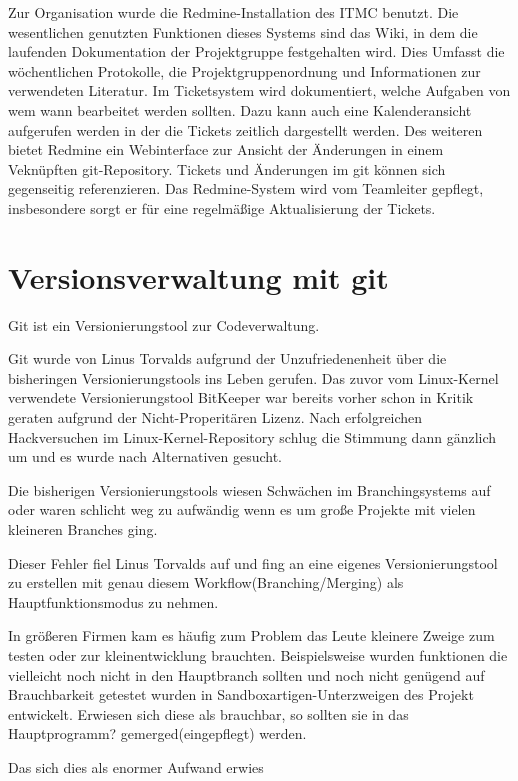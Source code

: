 Zur Organisation wurde die Redmine-Installation des ITMC benutzt. Die
wesentlichen genutzten Funktionen dieses Systems sind das Wiki, in dem die
laufenden Dokumentation der Projektgruppe festgehalten wird. Dies Umfasst die
wöchentlichen Protokolle, die Projektgruppenordnung und Informationen zur
verwendeten Literatur. Im Ticketsystem wird dokumentiert, welche Aufgaben von
wem wann bearbeitet werden sollten. Dazu kann auch eine Kalenderansicht
aufgerufen werden in der die Tickets zeitlich dargestellt werden. Des weiteren
bietet Redmine ein Webinterface zur Ansicht der Änderungen in einem Veknüpften
git-Repository. Tickets und Änderungen im git können sich gegenseitig
referenzieren. Das Redmine-System wird vom Teamleiter gepflegt, insbesondere
sorgt er für eine regelmäßige Aktualisierung der Tickets.

\section{Versionsverwaltung mit git}
\label{sec:orga:vers}
\label{sec:orga:vers:git}

Git ist ein Versionierungstool zur Codeverwaltung.

Git wurde von Linus Torvalds aufgrund der Unzufriedenenheit über die bisheringen Versionierungstools ins Leben gerufen. Das zuvor vom Linux-Kernel verwendete Versionierungstool BitKeeper war bereits vorher schon in Kritik geraten aufgrund der Nicht-Properitären Lizenz. Nach erfolgreichen Hackversuchen im Linux-Kernel-Repository schlug die Stimmung dann gänzlich um und es wurde nach Alternativen gesucht. 

Die bisherigen Versionierungstools wiesen Schwächen im Branchingsystems auf oder waren schlicht weg zu aufwändig wenn es um große Projekte mit vielen kleineren Branches ging.

Dieser Fehler fiel Linus Torvalds auf und fing an eine eigenes Versionierungstool zu erstellen mit genau diesem Workflow(Branching/Merging) als Hauptfunktionsmodus zu nehmen.

In größeren Firmen kam es häufig zum Problem das Leute kleinere Zweige zum testen oder zur kleinentwicklung brauchten. Beispielsweise wurden funktionen die vielleicht noch nicht in den Hauptbranch sollten und noch nicht genügend auf Brauchbarkeit getestet wurden in Sandboxartigen-Unterzweigen des Projekt entwickelt.
Erwiesen sich diese als brauchbar, so sollten sie in das Hauptprogramm? gemerged(eingepflegt) werden.

Das sich dies als enormer Aufwand erwies 

